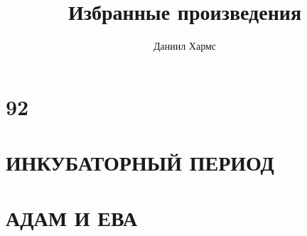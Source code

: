 \documentclass{book}
\title{Избранные произведения}
\author{Даниил Хармс}
\date{}
\begin{document}
	
	\maketitle
	
	\chapter{92}
	
	
	\chapter{ИНКУБАТОРНЫЙ ПЕРИОД}
	
	
	\chapter{АДАМ И ЕВА}
	
	
\end{document}
